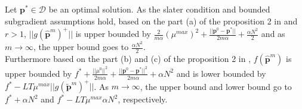 \documentclass[12pt,draftcls,onecolumn]{IEEEtran}
\begin{document}
\indent Let $\mathbf{p}^{*} \in \mathcal{D}$ be an optimal solution. As the slater condition and bounded subgradient assumptions hold, based on the part (a) of the proposition 2 in \cite{NO09} and $r>1$, $||g(\hat{\mathbf{p}}^{m})^{+}||$ is upper bounded by $\frac{2}{m \alpha}\left(\mu^{max}\right)^2+\frac{||\mathbf{p}^{0}-\mathbf{p}^{*}||}{2m\alpha}+\frac{\alpha N^2}{2}$ and as $m \rightarrow \infty$, the upper bound goes to $\frac{\alpha N^2}{2}$.\\
\indent Furthermore based on the part (b) and (c) of the proposition 2 in \cite{NO09}, $f(\hat{\mathbf{p}}^{m})$ is upper bounded by $f^{*}+\frac{||\mu^{0}||^2}{2m\alpha}+\frac{||\mathbf{p}^{0}-\mathbf{p}^{*}||^2}{2m\alpha}+\alpha N^2$ and is lower bounded by $f^{*}-LT\mu^{max}||g(\tilde{\mathbf{p}}^{m})^{+}||$. As $m \rightarrow \infty$, the upper bound and lower bound go to $f^{*}+\alpha N^2$ and $f^{*} - LT\mu^{max} \alpha N^2$, respectively.
\end{document}
